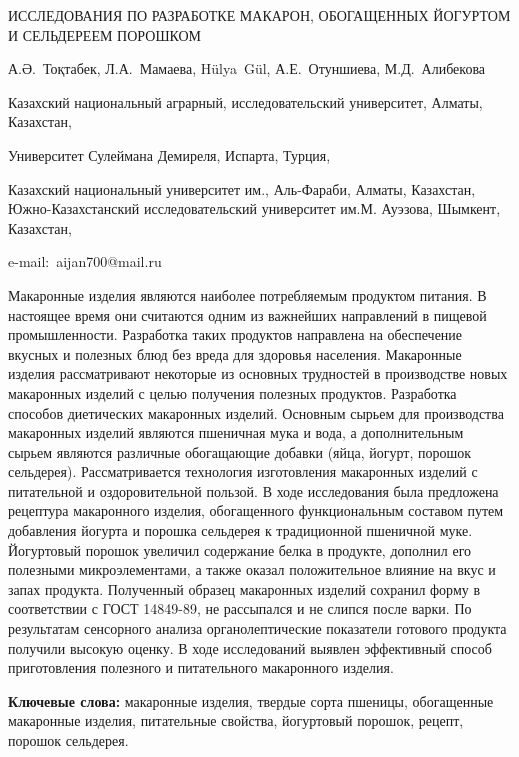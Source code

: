 \begin{header}
ИССЛЕДОВАНИЯ ПО РАЗРАБОТКЕ МАКАРОН, ОБОГАЩЕННЫХ ЙОГУРТОМ И СЕЛЬДЕРЕЕМ ПОРОШКОМ

А.Ә.~Тоқтабек\envelope,
Л.А.~Мамаева,
Hülya~Gül,
А.Е.~Отуншиева,
М.Д.~Алибекова
\end{header}

\begin{affil}
Казахский национальный аграрный, исследовательский университет, Алматы, Казахстан,

Университет Сулеймана Демиреля, Испарта, Турция,

Казахский национальный университет им., Аль-Фараби, Алматы, Казахстан, Южно-Казахстанский исследовательский университет им.М. Ауэзова, Шымкент, Казахстан,

e-mail:~aijan700@mail.ru
\end{affil}

Макаронные изделия являются наиболее потребляемым продуктом питания. В
настоящее время они считаются одним из важнейших направлений в пищевой
промышленности. Разработка таких продуктов направлена
на обеспечение вкусных и полезных блюд без вреда
для здоровья населения. Макаронные изделия рассматривают некоторые из
основных трудностей в производстве новых макаронных изделий с целью
получения полезных продуктов. Разработка способов диетических макаронных
изделий. Основным сырьем для производства макаронных изделий являются
пшеничная мука и вода, а дополнительным сырьем являются различные
обогащающие добавки (яйца, йогурт, порошок сельдерея). Рассматривается
технология изготовления макаронных изделий с питательной и
оздоровительной пользой. В ходе исследования была предложена рецептура
макаронного изделия, обогащенного функциональным составом путем
добавления йогурта и порошка сельдерея к традиционной пшеничной муке.
Йогуртовый порошок увеличил содержание белка в продукте, дополнил его
полезными микроэлементами, а также оказал положительное влияние на вкус
и запах продукта. Полученный образец макаронных изделий сохранил форму в
соответствии с ГОСТ 14849-89, не рассыпался и не слипся после варки. По
результатам сенсорного анализа органолептические показатели готового
продукта получили высокую оценку. В ходе исследований выявлен
эффективный способ приготовления полезного и питательного макаронного
изделия.

{\bfseries Ключевые слова:} макаронные изделия, твердые сорта пшеницы,
обогащенные макаронные изделия, питательные свойства, йогуртовый
порошок, рецепт, порошок сельдерея.

